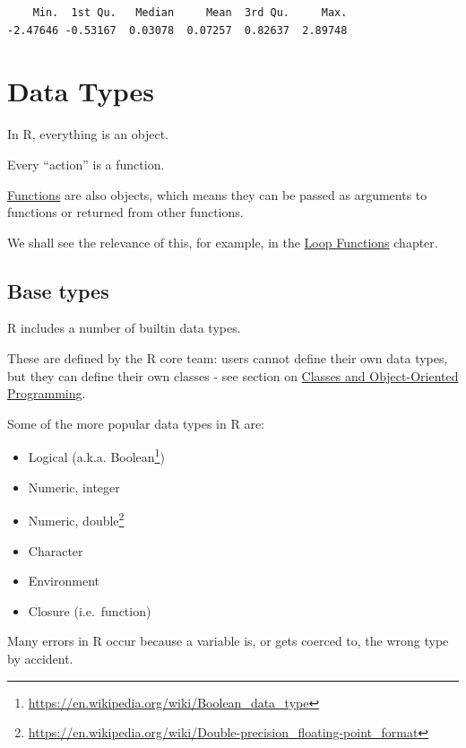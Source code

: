 \documentclass[
]{book}
\makeatletter
\providecommand{\tightlist}{%
  \setlength{\itemsep}{0pt}\setlength{\parskip}{0pt}}
\renewcommand{\href}[2]{#2\footnote{\url{#1}}}
\newenvironment{kframe}{%
\medskip{}
\setlength{\fboxsep}{.8em}
 \def\at@end@of@kframe{}%
 \ifinner\ifhmode%
  \def\at@end@of@kframe{\end{minipage}}%
  \begin{minipage}{\columnwidth}%
 \fi\fi%
 \def\FrameCommand##1{\hskip\@totalleftmargin \hskip-\fboxsep
 \colorbox{shadecolor}{##1}\hskip-\fboxsep
     \hskip-\linewidth \hskip-\@totalleftmargin \hskip\columnwidth}%
 \MakeFramed {\advance\hsize-\width
   \@totalleftmargin\z@ \linewidth\hsize
   \@setminipage}}%
 {\par\unskip\endMakeFramed%
 \at@end@of@kframe}
\newenvironment{rmdblock}[1]
  {
  \begin{itemize}
  \renewcommand{\labelitemi}{
    \raisebox{-.7\height}[0pt][0pt]{
      {\setkeys{Gin}{width=3em,keepaspectratio}\texttt{[image: images/\#1]}}
    }
  }
  \setlength{\fboxsep}{1em}
  \begin{kframe}
  \item
  }
  {
  \end{kframe}
  \end{itemize}
  }
\newenvironment{info}
  {\begin{rmdblock}{info}}
  {\end{rmdblock}}
\makeatother
\begin{document}
\begin{verbatim}
    Min.  1st Qu.   Median     Mean  3rd Qu.     Max. 
-2.47646 -0.53167  0.03078  0.07257  0.82637  2.89748 
\end{verbatim}

\hypertarget{types}{%
\chapter{Data Types}\label{types}}

\begin{info}
In R, everything is an object.

Every ``action'' is a function.

\protect\hyperlink{functions}{Functions} are also objects, which means
they can be passed as arguments to functions or returned from other
functions.

We shall see the relevance of this, for example, in the
\protect\hyperlink{loopfns}{Loop Functions} chapter.
\end{info}

\hypertarget{base-types}{%
\section{Base types}\label{base-types}}

R includes a number of builtin data types.

These are defined by the R core team: users cannot define their own data types, but they can define their own classes - see section on \protect\hyperlink{classes}{Classes and Object-Oriented Programming}.

Some of the more popular data types in R are:

\begin{itemize}
\tightlist
\item
  Logical (a.k.a. \href{https://en.wikipedia.org/wiki/Boolean_data_type}{Boolean})
\item
  Numeric, integer
\item
  Numeric, \href{https://en.wikipedia.org/wiki/Double-precision_floating-point_format}{double}
\item
  Character
\item
  Environment
\item
  Closure (i.e.~function)
\end{itemize}

\begin{Warning}
Many errors in R occur because a variable is, or gets coerced to, the
wrong type by accident.
\end{Warning}
\end{document}

